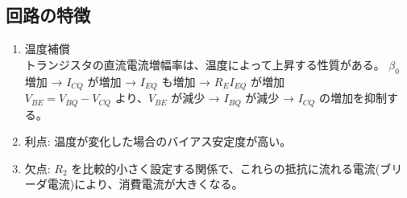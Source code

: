 \subsection{回路の特徴}
\begin{enumerate}
  \setlength{\parskip}{0cm} %
  \setlength{\itemsep}{0cm} %
  \item 温度補償\\
  トランジスタの直流電流増幅率は、温度によって上昇する性質がある。
  $\beta_{0}$ 増加 → $I_{CQ}$ が増加 → $I_{EQ}$ も増加 → $R_{E}I_{EQ}$ が増加\\
  $V_{BE} = V_{BQ} - V_{CQ}$ より、$V_{BE}$ が減少 → $I_{BQ}$ が減少 → $I_{CQ}$ の増加を抑制する。
  \item 利点: 温度が変化した場合のバイアス安定度が高い。
  \item 欠点: $R_2$ を比較的小さく設定する関係で、これらの抵抗に流れる電流(ブリーダ電流)により、消費電流が大きくなる。
\end{enumerate}

